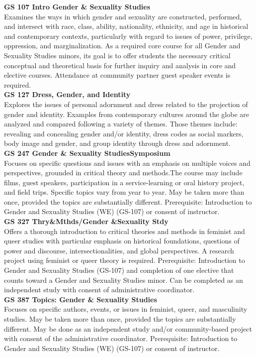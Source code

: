 \documentclass[
  letterpaper,
]{scrbook}
\begin{document}
\textbf{GS 107 Intro Gender \& Sexuality Studies}\\
Examines the ways in which gender and sexuality are constructed,
performed, and intersect with race, class, ability, nationality,
ethnicity, and age in historical and contemporary contexts, particularly
with regard to issues of power, privilege, oppression, and
marginalization. As a required core course for all Gender and Sexuality
Studies minors, its goal is to offer students the necessary critical
conceptual and theoretical basis for further inquiry and analysis in
core and elective courses. Attendance at community partner guest speaker
events is required.\\
\textbf{GS 127 Dress, Gender, and Identity}\\
Explores the issues of personal adornment and dress related to the
projection of gender and identity. Examples from contemporary cultures
around the globe are analyzed and compared following a variety of
themes. Those themes include: revealing and concealing gender and/or
identity, dress codes as social markers, body image and gender, and
group identity through dress and adornment.\\
\textbf{GS 247 Gender \& Sexuality StudiesSymposium}\\
Focuses on specific questions and issues with an emphasis on multiple
voices and perspectives, grounded in critical theory and methods.The
course may include films, guest speakers, participation in a
service-learning or oral history project, and field trips. Specific
topics vary from year to year. May be taken more than once, provided the
topics are substantially different. Prerequisite: Introduction to Gender
and Sexuality Studies (WE) (GS-107) or consent of instructor.\\
\textbf{GS 327 Thry\&Mthds/Gender \&Sexuality Stdy}\\
Offers a thorough introduction to critical theories and methods in
feminist and queer studies with particular emphasis on historical
foundations, questions of power and discourse, intersectionalities, and
global perspectives. A research project using feminist or queer theory
is required. Prerequisite: Introduction to Gender and Sexuality Studies
(GS-107) and completion of one elective that counts toward a Gender and
Sexuality Studies minor. Can be completed as an independent study with
consent of administrative coordinator.\\
\textbf{GS 387 Topics: Gender \& Sexuality Studies}\\
Focuses on specific authors, events, or issues in feminist, queer, and
masculinity studies. May be taken more than once, provided the topics
are substantially different. May be done as an independent study and/or
community-based project with consent of the administrative coordinator.
Prerequisite: Introduction to Gender and Sexuality Studies (WE) (GS-107)
or consent of instructor.
\end{document}

